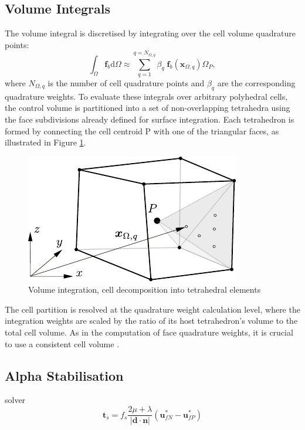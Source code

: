\documentclass[sn-mathphys,Numbered]{sn-jnl}%
\newcommand{\bb}{\boldsymbol}
\begin{document}
\subsection{Volume Integrals}
\label{sec:vol_int}
%
The volume integral is discretised by integrating over the cell volume quadrature points:
%
\begin{equation}
\int_{\Omega} \bb{f}_b \text{d}\Omega
\approx
 \sum_{q=1}^{q=N_{\Omega,q}}\beta_q \; \bb{f}_b(\bb{x}_{\Omega,q})  \Omega_P,
\end{equation}
%
where $N_{\Omega,q}$ is the number of cell quadrature points and $\beta_q$ are the corresponding quadrature weights.
To evaluate these integrals over arbitrary polyhedral cells, the control volume is partitioned into a set of non-overlapping tetrahedra using the face subdivisions already defined for surface integration.
Each tetrahedron is formed by connecting the cell centroid P with one of the triangular faces, as illustrated in Figure \ref{fig:volumeTerm}.
\begin{figure}[h]
 	\centering
    \includegraphics[scale=0.8]{figures/volumeTerm} 
 	\caption{Volume integration, cell decomposition into tetrahedral elements}
 	\label{fig:volumeTerm}
\end{figure}
The cell partition is resolved at the quadrature weight calculation level, where the integration weights are scaled by the ratio of its host tetrahedron’s volume to the total cell volume. As in the computation of face quadrature weights, it is crucial to use a consistent cell volume \cite{Nishikawa2025}.
%
\subsection{Alpha Stabilisation}
\label{sec:vol_int}
%
solver
\begin{equation}
\bb{t}_s = f_s \frac{2\mu +\lambda}{|\bb{d} \cdot \bb{n}|}(\bb{u}_{fN}^*-\bb{u}_{fP}^*)
\end{equation}
\end{document}
